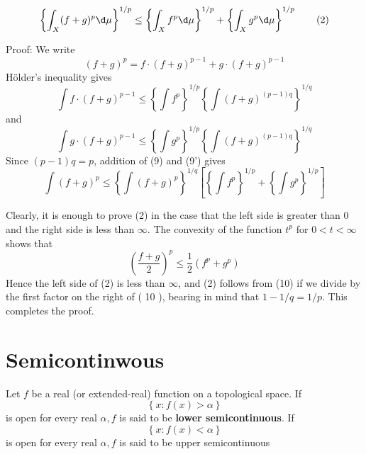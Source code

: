 \documentclass[12pt, a4paper, oneside]{book}
\begin{document}
\begin{theorem}\
    \begin{equation}
        \left\{\int_{X}(f+g)^{p} \d  \mu\right\}^{1 / p} \leq\left\{\int_{X} f^{p} \d  \mu\right\}^{1 / p}+\left\{\int_{X} g^{p} \d  \mu\right\}^{1 / p} \tag{2}
    \end{equation}

    Proof:
    We write
    \begin{equation}
        (f+g)^{p}=f \cdot(f+g)^{p-1}+g \cdot(f+g)^{p-1} \tag{8}
    \end{equation}
    Hölder's inequality gives
    \begin{equation}
        \int f \cdot(f+g)^{p-1} \leq\left\{\int f^{p}\right\}^{1 / p}\left\{\int(f+g)^{(p-1) q}\right\}^{1 / q} \tag{9}
    \end{equation}
    and
    \begin{equation}
        \int g \cdot(f+g)^{p-1} \leq \left\{\int g^{p}\right\}^{1 / p}\left\{\int(f+g)^{(p-1) q}\right\}^{1 / q} \tag{9'}
    \end{equation}
    Since $(p-1) q=p$, addition of (9) and (9') gives
    \begin{equation}
        \int(f+g)^{p} \leq\left\{\int(f+g)^{p}\right\}^{1 / q}\left[\left\{\int f^{p}\right\}^{1 / p}+\left\{\int g^{p}\right\}^{1 / p}\right] \tag{10}
    \end{equation}


    Clearly, it is enough to prove (2) in the case that the left side is greater than 0 and the right side is less than $\infty$. The convexity of the function $t^{p}$ for $0<t<\infty$ shows that
    $$
        \left(\frac{f+g}{2}\right)^{p} \leq \frac{1}{2}\left(f^{p}+g^{p}\right)
    $$
    Hence the left side of (2) is less than $\infty$, and (2) follows from (10) if we divide by the first factor on the right of ( 10 ), bearing in mind that $1-1 / q=1 / p$. This completes the proof.
\end{theorem}




\section{Semicontinwous}
\begin{definition}
    Let $f$ be a real (or extended-real) function on a topological space. If
    $$\left\{x: f(x)>\alpha\right\}$$
    is open for every real $\alpha, f$ is said to be \textbf{lower semicontinuous}. If
    $$\left\{x: f(x)<\alpha\right\}$$
    is open for every real $\alpha, f$ is said to be upper semicontinuous
\end{definition}
\end{document}
